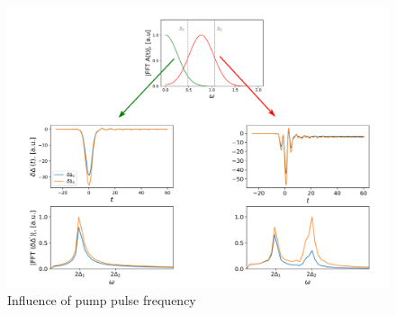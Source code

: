 \documentclass[aps,prb,reprint,noeprint,superscriptaddress]{revtex4-2}
\begin{document}
\begin{figure}[H]
    \centering
    \includegraphics[width=\columnwidth]{figures/influence_pump_pulse_freq.png}
    \caption{\label{fig:influence_pump_pulse_freq}%
    Influence of pump pulse frequency}
\end{figure}%
\end{document}
